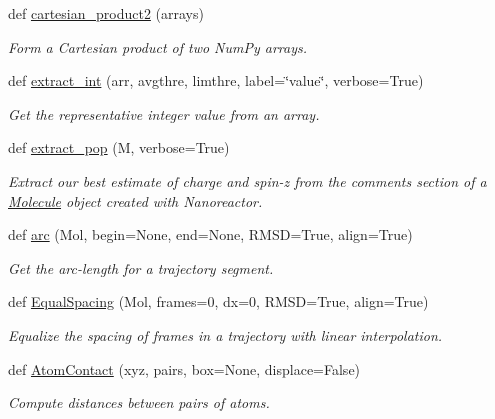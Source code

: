 \begin{DoxyCompactItemize}
\item 
def \hyperlink{namespacesrc_1_1molecule_a8d9cdc5fd67e79c8b1edac8159d2e370}{cartesian\+\_\+product2} (arrays)
\begin{DoxyCompactList}\small\item\em Form a Cartesian product of two Num\+Py arrays. \end{DoxyCompactList}\item 
def \hyperlink{namespacesrc_1_1molecule_a926fcd7399f5becbd07f69cff154dca7}{extract\+\_\+int} (arr, avgthre, limthre, label=\char`\"{}value\char`\"{}, verbose=True)
\begin{DoxyCompactList}\small\item\em Get the representative integer value from an array. \end{DoxyCompactList}\item 
def \hyperlink{namespacesrc_1_1molecule_a76b7defcd5b5e5db182fdf2f9f82f4ce}{extract\+\_\+pop} (M, verbose=True)
\begin{DoxyCompactList}\small\item\em Extract our best estimate of charge and spin-\/z from the comments section of a \hyperlink{classsrc_1_1molecule_1_1Molecule}{Molecule} object created with Nanoreactor. \end{DoxyCompactList}\item 
def \hyperlink{namespacesrc_1_1molecule_a28c672c2de7b942b427a22f3b433b04e}{arc} (Mol, begin=None, end=None, R\+M\+SD=True, align=True)
\begin{DoxyCompactList}\small\item\em Get the arc-\/length for a trajectory segment. \end{DoxyCompactList}\item 
def \hyperlink{namespacesrc_1_1molecule_af77e6cac48816736aa9a5cfa2f74071b}{Equal\+Spacing} (Mol, frames=0, dx=0, R\+M\+SD=True, align=True)
\begin{DoxyCompactList}\small\item\em Equalize the spacing of frames in a trajectory with linear interpolation. \end{DoxyCompactList}\item 
def \hyperlink{namespacesrc_1_1molecule_a8f70cfe4842e1f08578785ef9a95babc}{Atom\+Contact} (xyz, pairs, box=None, displace=False)
\begin{DoxyCompactList}\small\item\em Compute distances between pairs of atoms. \end{DoxyCompactList}\item 

\end{DoxyCompactItemize}
